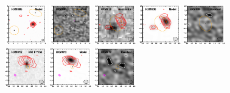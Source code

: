 \documentclass[iop]{emulateapj}
\begin{document}
\begin{figure}[!tbp]
\begin{centering}
\includegraphics[width=0.162\textwidth]{HXMM05_model_bestfit.pdf}
\includegraphics[width=0.162\textwidth]{HXMM05_residual_bestfit.pdf}
\includegraphics[width=0.162\textwidth]{HXMM30_optical_bestfit.pdf}
\includegraphics[width=0.162\textwidth]{HXMM30_model_bestfit.pdf}
\includegraphics[width=0.162\textwidth]{HXMM30_residual_bestfit.pdf}
\includegraphics[width=0.162\textwidth]{HXMM12_optical_bestfit.pdf}
\includegraphics[width=0.162\textwidth]{HXMM12_model_bestfit.pdf}
\includegraphics[width=0.162\textwidth]{HXMM12_residual_bestfit.pdf}
\end{centering}


\end{figure}
\end{document}
